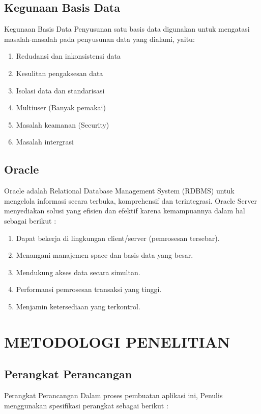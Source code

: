 \documentclass{jtetiproposalskripsi}
\begin{document}
\section{Kegunaan Basis Data}
Kegunaan Basis Data Penyusunan satu basis data digunakan untuk mengatasi masalah-masalah pada penyusunan data yang dialami, yaitu: 
\begin{enumerate}
\item Redudansi dan inkonsistensi data 
\item Kesulitan pengaksesan data 
\item Isolasi data dan standarisasi
\item Multiuser (Banyak pemakai) 
\item Masalah keamanan (Security) 
\item Masalah intergrasi
\end{enumerate}

\section{Oracle}
Oracle adalah Relational Database Management System (RDBMS) untuk mengelola informasi secara terbuka, komprehensif dan terintegrasi. Oracle Server menyediakan solusi yang efisien dan efektif karena kemampuannya dalam hal sebagai berikut : 
\begin{enumerate}
\item Dapat bekerja di lingkungan client/server (pemrosesan tersebar). 
\item Menangani manajemen space dan basis data yang besar. 
\item Mendukung akses data secara simultan. 
\item Performansi pemrosesan transaksi yang tinggi. 
\item Menjamin ketersediaan yang terkontrol.
\end{enumerate}






\chapter{METODOLOGI PENELITIAN}

\section{Perangkat Perancangan}
Perangkat Perancangan Dalam proses pembuatan aplikasi ini, Penulis menggunakan spesifikasi perangkat sebagai berikut : 
\end{document}
